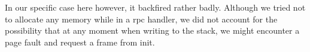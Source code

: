 In our specific case here however, it backfired rather badly. Although we tried not to allocate any memory while
in a rpc handler, we did not account for the possibility that at any moment when writing to the stack, we might
encounter a page fault and request a frame from init.
\begin{figure}[ht]
    \centering
    
    
\end{figure}
